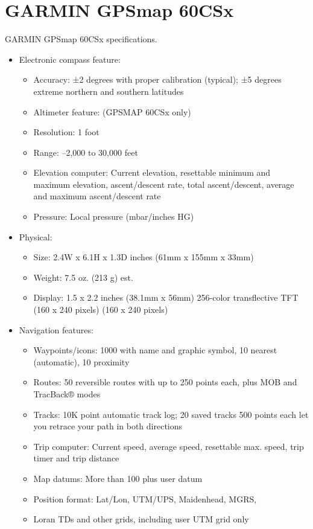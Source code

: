 \chapter{GARMIN GPSmap 60CSx}
\label{AppendixB}

GARMIN GPSmap 60CSx specifications.

\begin{itemize}
\item Electronic compass feature:
  \begin{itemize}
	\item Accuracy: ±2 degrees with proper calibration (typical); ±5 degrees extreme northern and southern latitudes 
	\item Altimeter feature: (GPSMAP 60CSx only) 
	\item Resolution: 1 foot 
	\item Range: –2,000 to 30,000 feet 
	\item Elevation computer: Current elevation, resettable minimum and maximum elevation, ascent/descent rate, total ascent/descent, average and maximum ascent/descent rate 
	\item Pressure: Local pressure (mbar/inches HG) 
  \end{itemize}

\item Physical:
  \begin{itemize}
	\item Size: 2.4W x 6.1H x 1.3D inches (61mm x 155mm x 33mm) 
	\item Weight: 7.5 oz. (213 g) est. 
	\item Display: 1.5 x 2.2 inches (38.1mm x 56mm) 256-color transflective TFT (160 x 240 pixels) (160 x 240 pixels) 
  \end{itemize}

\item Navigation features:
  \begin{itemize}
	\item Waypoints/icons: 1000 with name and graphic symbol, 10 nearest (automatic), 10 proximity 
	\item Routes: 50 reversible routes with up to 250 points each, plus MOB and TracBack® modes 
	\item Tracks: 10K point automatic track log; 20 saved tracks 500 points each let you retrace your path in both directions 
	\item Trip computer: Current speed, average speed, resettable max. speed, trip timer and trip distance 
	\item Map datums: More than 100 plus user datum 
	\item Position format: Lat/Lon, UTM/UPS, Maidenhead, MGRS, 
	\item Loran TDs and other grids, including user UTM grid only 
  \end{itemize}


\end{itemize}
